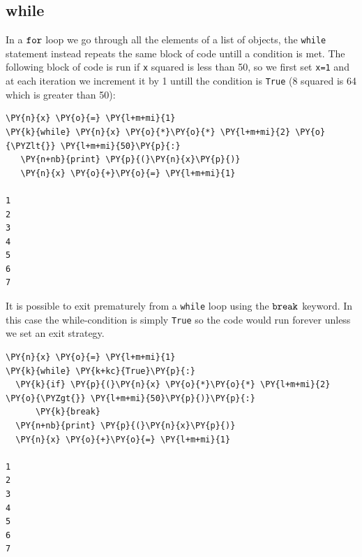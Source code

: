 \subsection{while}\label{while}

In a $\tt{for}$ loop we go through all the elements of a list of objects, the \texttt{while} statement instead repeats the same block of code untill a condition is met.
The following block of code is run if \texttt{x} squared is less than 50, so we first set \texttt{x=1} and at each iteration we increment it by 1 untill the condition is \texttt{True} (8 squared is 64 which is greater than 50):

\begin{tcolorbox}[breakable, size=fbox, boxrule=1pt, pad at break*=1mm, colback=cellbackground, colframe=cellborder]            
\begin{Verbatim}[commandchars=\\\{\}]
\PY{n}{x} \PY{o}{=} \PY{l+m+mi}{1}
\PY{k}{while} \PY{n}{x} \PY{o}{*}\PY{o}{*} \PY{l+m+mi}{2} \PY{o}{\PYZlt{}} \PY{l+m+mi}{50}\PY{p}{:}
   \PY{n+nb}{print} \PY{p}{(}\PY{n}{x}\PY{p}{)}
   \PY{n}{x} \PY{o}{+}\PY{o}{=} \PY{l+m+mi}{1}

1
2
3
4
5
6
7
\end{Verbatim}
\end{tcolorbox}

It is possible to exit prematurely from a \texttt{while} loop using the $\tt{break}$ keyword. In this case the while-condition is simply \texttt{True} so the code would run forever unless we set an exit strategy.

\begin{tcolorbox}[breakable, size=fbox, boxrule=1pt, pad at break*=1mm, colback=cellbackground, colframe=cellborder]            
\begin{Verbatim}[commandchars=\\\{\}]
\PY{n}{x} \PY{o}{=} \PY{l+m+mi}{1}
\PY{k}{while} \PY{k+kc}{True}\PY{p}{:}
  \PY{k}{if} \PY{p}{(}\PY{n}{x} \PY{o}{*}\PY{o}{*} \PY{l+m+mi}{2} \PY{o}{\PYZgt{}} \PY{l+m+mi}{50}\PY{p}{)}\PY{p}{:} 
      \PY{k}{break}
  \PY{n+nb}{print} \PY{p}{(}\PY{n}{x}\PY{p}{)}
  \PY{n}{x} \PY{o}{+}\PY{o}{=} \PY{l+m+mi}{1} 

1
2
3
4
5
6
7
\end{Verbatim}
\end{tcolorbox}
